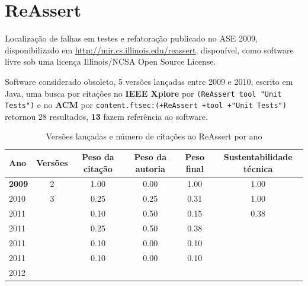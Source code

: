 \section{ReAssert}

Localização de falhas em testes e refatoração
publicado no ASE 2009,
disponibilizado em \url{http://mir.cs.illinois.edu/reassert},
disponível,
como software livre
sob uma licença Illinois/NCSA Open Source License.

Software considerado obsoleto,
5 versões lançadas
entre 2009 e 2010,
escrito em Java,
uma busca por citações no {\bf IEEE Xplore} por
\texttt{(ReAssert tool "Unit Tests")}
e no {\bf ACM} por
\texttt{content.ftsec:(+ReAssert +tool +"Unit Tests")}
retornou
28 resultados,
{\bf 13} fazem referência ao software.


\begin{table}[H]
\caption{Versões lançadas e número de citações ao ReAssert por ano}
\centering
\begin{tabular}{| l | c | c | c | c | c |}
  \hline
  Ano & Versões & Peso da citação & Peso da autoria & Peso final & Sustentabilidade técnica \\
  \hline
            {\bf 2009}
          &
          2
          &
          1.00
          &
          0.00
          &
          1.00
          &
            {\color{blue} 1.00}
          \\
\hline
            2010
          &
          3
          &
          0.25
          &
          0.25
          &
          0.31
          &
            {\color{blue} 1.00}
          \\
\hline
            2011
          &
          
          &
          0.10
          &
          0.50
          &
          0.15
          &
            {\color{red} 0.38}
          \\
            2011
          &
          
          &
          0.25
          &
          0.50
          &
          0.38
          &
          \\
            2011
          &
          
          &
          0.10
          &
          0.00
          &
          0.10
          &
          \\
            2011
          &
          
          &
          0.10
          &
          0.00
          &
          0.10
          &
          \\
\hline
            2012
          &
          

\end{tabular}
\end{table}
